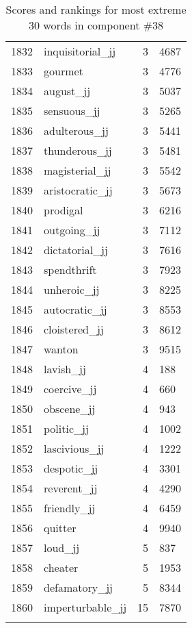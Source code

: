\begin{longtable}[!htbp]{| rlr@{.}l |}
    1832 & inquisitorial\_jj & 3 & 4687 \\
    1833 & gourmet & 3 & 4776 \\
    1834 & august\_jj & 3 & 5037 \\
    1835 & sensuous\_jj & 3 & 5265 \\
    1836 & adulterous\_jj & 3 & 5441 \\
    1837 & thunderous\_jj & 3 & 5481 \\
    1838 & magisterial\_jj & 3 & 5542 \\
    1839 & aristocratic\_jj & 3 & 5673 \\
    1840 & prodigal & 3 & 6216 \\
    1841 & outgoing\_jj & 3 & 7112 \\
    1842 & dictatorial\_jj & 3 & 7616 \\
    1843 & spendthrift & 3 & 7923 \\
    1844 & unheroic\_jj & 3 & 8225 \\
    1845 & autocratic\_jj & 3 & 8553 \\
    1846 & cloistered\_jj & 3 & 8612 \\
    1847 & wanton & 3 & 9515 \\
    1848 & lavish\_jj & 4 & 188 \\
    1849 & coercive\_jj & 4 & 660 \\
    1850 & obscene\_jj & 4 & 943 \\
    1851 & politic\_jj & 4 & 1002 \\
    1852 & lascivious\_jj & 4 & 1222 \\
    1853 & despotic\_jj & 4 & 3301 \\
    1854 & reverent\_jj & 4 & 4290 \\
    1855 & friendly\_jj & 4 & 6459 \\
    1856 & quitter & 4 & 9940 \\
    1857 & loud\_jj & 5 & 837 \\
    1858 & cheater & 5 & 1953 \\
    1859 & defamatory\_jj & 5 & 8344 \\
    1860 & imperturbable\_jj & 15 & 7870 \\
    \hline
    \caption{Scores and rankings for most extreme 30 words in component \#38} \\
\end{longtable}
